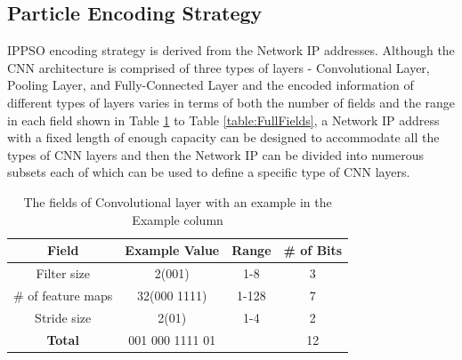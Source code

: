 \documentclass[conference]{IEEEtran}
\begin{document}
\subsection{Particle Encoding Strategy}\label{sec:ParticleEncodingStrategy}
IPPSO encoding strategy is derived from the Network IP addresses. Although the CNN architecture is comprised of three types of layers - Convolutional Layer, Pooling Layer, and Fully-Connected Layer and the encoded information of different types of layers varies in terms of both the number of fields and the range in each field shown in Table \ref{table:ConvFields} to Table \ref{table:FullFields}, a Network IP address with a fixed length of enough capacity can be designed to accommodate all the types of CNN layers and then the Network IP can be divided into numerous subsets each of which can be used to define a specific type of CNN layers. 

\begin{table}[!t]
	\renewcommand{\arraystretch}{1.3}
	\caption{The fields of Convolutional layer with an example in the Example column}
	\label{table:ConvFields}
	\centering
	\begin{tabular}{|c|c|c|c|}
		\hline
		Field & Example Value & Range & \# of Bits\\
		\hline
		Filter size & 2(001) & 1-8 & 3\\
		\hline
		\# of feature maps & 32(000 1111) & 1-128 & 7\\
		\hline
		Stride size & 2(01) & 1-4 & 2\\
		\hline
		\textbf{Total} & 001 000 1111 01 &  & 12\\
		\hline
	\end{tabular}
\end{table}
\end{document}
